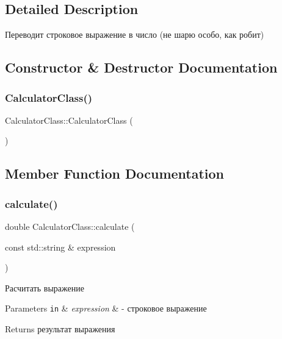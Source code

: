 \subsection{Detailed Description}
Переводит строковое выражение в число (не шарю особо, как робит) 

\subsection{Constructor \& Destructor Documentation}
\mbox{\label{class_calculator_class_a626df0251eb67897ea4a0d85535462d4}} 
\subsubsection{\texorpdfstring{Calculator\+Class()}{CalculatorClass()}}
{\footnotesize\ttfamily Calculator\+Class\+::\+Calculator\+Class (\begin{DoxyParamCaption}{ }\end{DoxyParamCaption})}



\subsection{Member Function Documentation}
\mbox{\label{class_calculator_class_a88a60d0c23c67a06c8e62b217607d24d}} 
\subsubsection{\texorpdfstring{calculate()}{calculate()}}
{\footnotesize\ttfamily double Calculator\+Class\+::calculate (\begin{DoxyParamCaption}\item[{const std\+::string \&}]{expression }\end{DoxyParamCaption})}



Расчитать выражение 


\begin{DoxyParams}[1]{Parameters}
\mbox{\tt in}  & {\em expression} & -\/ строковое выражение \\
\hline
\end{DoxyParams}
\begin{DoxyReturn}{Returns}
результат выражения 
\end{DoxyReturn}
\mbox{\label{class_calculator_class_aed5fb4ee064e28ef02c806de466b3008}} 
